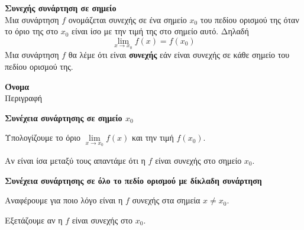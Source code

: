 \documentclass[twoside,nofonts,internet,math,spyros]{frontisthrio}
\begin{document}
\newpage
\orismoi
\begin{arithmisi}
\item\textbf{Συνεχής συνάρτηση σε σημείο}\\
Μια συνάρτηση $ f $ ονομάζεται συνεχής σε ένα σημείο $ x_0 $ του πεδίου ορισμού της όταν το όριο της στο $ x_0 $ είναι ίσο με την τιμή της στο σημείο αυτό. Δηλαδή \[ \lim_{x\rightarrow x_0}{f(x)}=f(x_0) \]
Μια συνάρτηση $ f $ θα λέμε ότι είναι \textbf{συνεχής} εάν είναι συνεχής σε κάθε σημείο του πεδίου ορισμού της.
\end{arithmisi}
\thewrhmata
\begin{arithmisi}
\item\textbf{Όνομα}\\
Περιγραφή
\end{arithmisi}
\methodologia
\begin{arithmisi}
\item\textbf{Συνέχεια συνάρτησης σε σημείο $ x_0 $}
\begin{bhma}
\item Υπολογίζουμε το όριο $ \lim\limits_{x\to x_0}{f(x)} $ και την τιμή $ f(x_0) $.
\item Αν είναι ίσα μεταξύ τους απαντάμε ότι η $ f $ είναι συνεχής στο σημείο $ x_0 $.
\end{bhma}
\item\textbf{Συνέχεια συνάρτησης σε όλο το πεδίο ορισμού με δίκλαδη συνάρτηση}
\begin{bhma}
\item Αναφέρουμε για ποιο λόγο είναι η $ f $ συνεχής στα σημεία $ x\neq x_0 $.
\item Εξετάζουμε αν η $ f $ είναι συνεχής στο $ x_0 $.
\end{bhma}
\end{arithmisi}
\newpage
\end{document}
